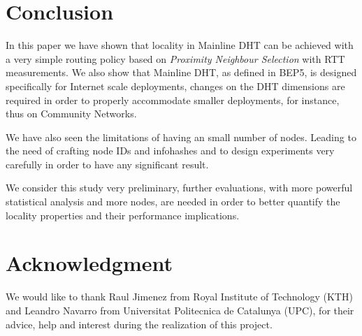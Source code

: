 \documentclass[conference]{IEEEtran}
\begin{document}
\section{Conclusion}
In this paper we have shown that locality in Mainline DHT can be achieved with a very simple routing policy based on \textit{Proximity Neighbour Selection} with RTT measurements. We also show that Mainline DHT, as defined in BEP5, is designed specifically for Internet scale deployments, changes on the DHT dimensions are required in order to properly accommodate smaller deployments, for instance, thus on Community Networks.

We have also seen the limitations of having an small number of nodes. Leading to the need of crafting node IDs and infohashes and to design experiments very carefully in order to have any significant result.

We consider this study very preliminary, further evaluations, with more powerful statistical analysis and more nodes, are needed in order to better quantify the locality properties and their performance implications.

\section*{Acknowledgment}


We would like to thank Raul Jimenez from Royal Institute of Technology (KTH) and
Leandro Navarro from Universitat Politecnica de Catalunya (UPC), for their advice, help and interest during the realization of this project.


\ifCLASSOPTIONcaptionsoff
  \newpage
\fi




\end{document}
